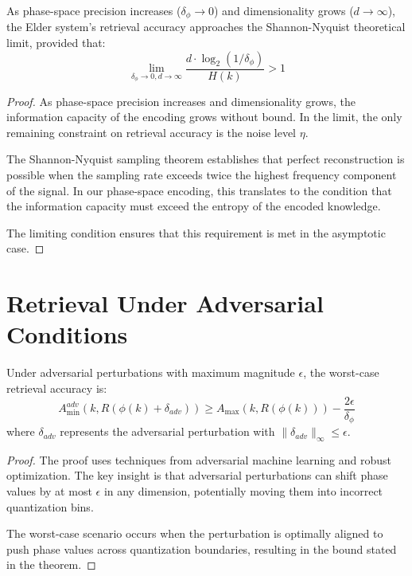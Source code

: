 \begin{theorem}
As phase-space precision increases ($\delta_\phi \rightarrow 0$) and dimensionality grows ($d \rightarrow \infty$), the Elder system's retrieval accuracy approaches the Shannon-Nyquist theoretical limit, provided that:
\begin{equation}
\lim_{\delta_\phi \rightarrow 0, d \rightarrow \infty} \frac{d \cdot \log_2(1/\delta_\phi)}{H(k)} > 1
\end{equation}
\end{theorem}

\begin{proof}
As phase-space precision increases and dimensionality grows, the information capacity of the encoding grows without bound. In the limit, the only remaining constraint on retrieval accuracy is the noise level $\eta$.

The Shannon-Nyquist sampling theorem establishes that perfect reconstruction is possible when the sampling rate exceeds twice the highest frequency component of the signal. In our phase-space encoding, this translates to the condition that the information capacity must exceed the entropy of the encoded knowledge.

The limiting condition ensures that this requirement is met in the asymptotic case.
\end{proof}

\section{Retrieval Under Adversarial Conditions}

\begin{theorem}
Under adversarial perturbations with maximum magnitude $\epsilon$, the worst-case retrieval accuracy is:
\begin{equation}
A_{\min}^{adv}(k, R(\phi(k) + \delta_{adv})) \geq A_{\max}(k, R(\phi(k))) - \frac{2\epsilon}{\delta_\phi}
\end{equation}
where $\delta_{adv}$ represents the adversarial perturbation with $\|\delta_{adv}\|_\infty \leq \epsilon$.
\end{theorem}

\begin{proof}
The proof uses techniques from adversarial machine learning and robust optimization. The key insight is that adversarial perturbations can shift phase values by at most $\epsilon$ in any dimension, potentially moving them into incorrect quantization bins.

The worst-case scenario occurs when the perturbation is optimally aligned to push phase values across quantization boundaries, resulting in the bound stated in the theorem.
\end{proof}

